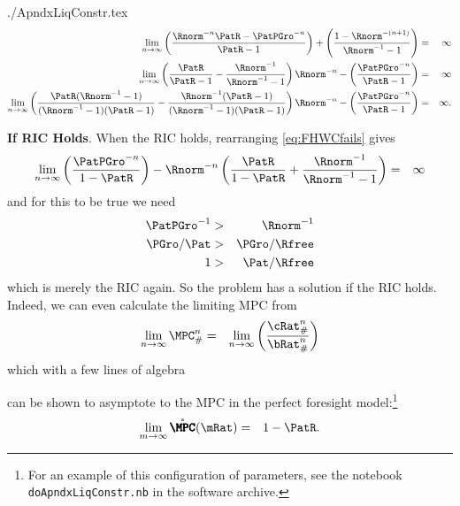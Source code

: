 \documentclass{econtex}
\begin{document}
\begin{verbatimwrite}{./ApndxLiqConstr.tex}
\begin{eqnarray}
  \lim_{n \rightarrow \infty} \left(\frac{\Rnorm^{-n}\PatR-\PatPGro^{-n}}{\PatR-1}\right) + \left(\frac{1-\Rnorm^{-(n+1)}}{\Rnorm^{-1}-1}\right) & = & \infty \notag
\\   \lim_{n \rightarrow \infty} \left(\frac{\PatR}{\PatR-1}-\frac{\Rnorm^{-1}}{\Rnorm^{-1}-1}\right)\Rnorm^{-n}-\left(\frac{\PatPGro^{-n}}{\PatR-1}\right) & = & \infty \notag
\\   \lim_{n \rightarrow \infty} \left(\frac{\PatR(\Rnorm^{-1}-1)}{(\Rnorm^{-1}-1)(\PatR-1)}-\frac{\Rnorm^{-1}(\PatR-1)}{(\Rnorm^{-1}-1)(\PatR-1)}\right)\Rnorm^{-n}-\left(\frac{\PatPGro^{-n}}{\PatR-1}\right) & = & \infty. \label{eq:FHWCfails}
\end{eqnarray}

{\bf If RIC Holds}.  When the RIC holds, rearranging \eqref{eq:FHWCfails} gives
\begin{eqnarray*}
  \lim_{n \rightarrow \infty} \left(\frac{\PatPGro^{-n}}{1-\PatR}\right)-\Rnorm^{-n}\left(\frac{\PatR}{1-\PatR}+\frac{\Rnorm^{-1}}{\Rnorm^{-1}-1}\right) & = & \infty
\end{eqnarray*}
and for this to be true we need
\begin{eqnarray*}
  \PatPGro^{-1} & > & \Rnorm^{-1}
\\ \PGro/\Pat & > & \PGro/\Rfree
\\ 1 & > & \Pat/\Rfree
\end{eqnarray*}
which is merely the RIC again.  So the problem has a solution if the RIC holds.  Indeed,
we can even calculate the limiting MPC from
\begin{eqnarray}
  \lim_{n \rightarrow \infty} \MPC^{n}_{\#} & = & \lim_{n \rightarrow \infty} \left(\frac{\cRat_{\#}^{n}}{\bRat_{\#}^{n}}\right)
\end{eqnarray}
which with a few lines of algebra
\begin{comment}
Calculate the limit of
\begin{eqnarray}
\left(\frac{\PatPGro^{-n}}{\PatPGro^{-n}/(1-\PatR) - (1-\Rnorm^{-1}\Rnorm^{-n})/(1-\Rnorm^{-1})}\right) & = & \left(\frac{1}{1/(1-\PatR) + \Rnorm^{-n}\Rnorm^{-1}/(1-\Rnorm^{-1})}\right)
\end{eqnarray}
\end{comment}
can be shown to asymptote to the MPC in the perfect foresight model:\footnote{For an example of this configuration of parameters, see the notebook \texttt{doApndxLiqConstr.nb} in the software archive.}
\begin{eqnarray}
  \lim_{m \rightarrow \infty} \mathring{\pmb{\MPC}}(\mRat) & = & 1-\PatR.
\end{eqnarray}


\end{verbatimwrite}
\end{document}
